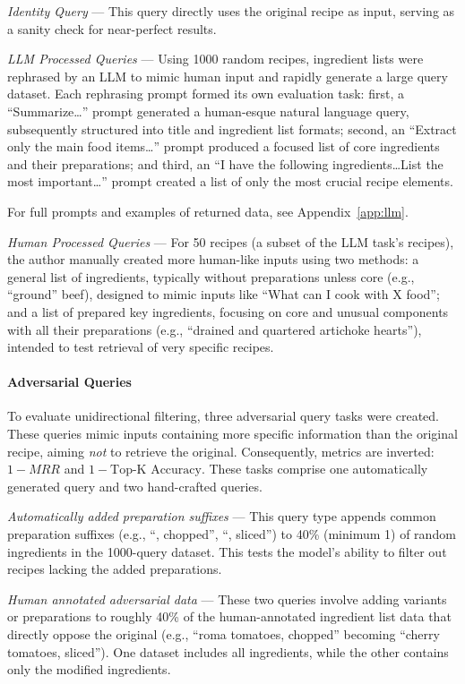 \documentclass[11pt]{article}
\begin{document}
\emph{Identity Query} --- This query directly uses the original recipe as input, serving as a sanity check for near-perfect results.

\emph{LLM Processed Queries} --- Using 1000 random recipes, ingredient lists
were rephrased by an LLM to mimic human input and rapidly generate a large query
dataset.
Each rephrasing prompt formed its own evaluation task: first, a
``Summarize\ldots'' prompt generated a human-esque natural language query,
subsequently structured into title and ingredient list formats; second, an
``Extract only the main food items\ldots'' prompt produced a focused list of
core ingredients and their preparations; and third, an ``I have the following
ingredients\ldots List the most important\ldots'' prompt created a list of only
the most crucial recipe elements.  

For full prompts and examples of returned data, see Appendix~\ref{app:llm}.

\emph{Human Processed Queries} --- For 50 recipes (a subset of the LLM task's
recipes), the author manually created more human-like inputs using two methods:
a general list of ingredients, typically without preparations unless core (e.g.,
``ground'' beef), designed to mimic inputs like ``What can I cook with X
food''; and a list of prepared key ingredients, focusing on core and unusual
components with all their preparations (e.g., ``drained and quartered artichoke
hearts''), intended to test retrieval of very specific recipes.

\paragraph{Adversarial Queries}
To evaluate unidirectional filtering, three adversarial query tasks were created.
These queries mimic inputs containing more specific information than the
original recipe, aiming \emph{not} to retrieve the original.
Consequently, metrics are inverted: $1-MRR$ and $1-\text{Top-K Accuracy}$.
These tasks comprise one automatically generated query and two hand-crafted queries.

\emph{Automatically added preparation suffixes} --- This query type appends
common preparation suffixes (e.g., ``, chopped'', ``, sliced'') to 40\% (minimum
1) of random ingredients in the 1000-query dataset.
This tests the model's ability to filter out recipes lacking the added preparations.

\emph{Human annotated adversarial data} --- These two queries involve adding
variants or preparations to roughly 40\% of the human-annotated ingredient list
data that directly oppose the original (e.g., ``roma tomatoes, chopped''
becoming ``cherry tomatoes, sliced'').
One dataset includes all ingredients, while the other contains only the modified
ingredients.
\end{document}
